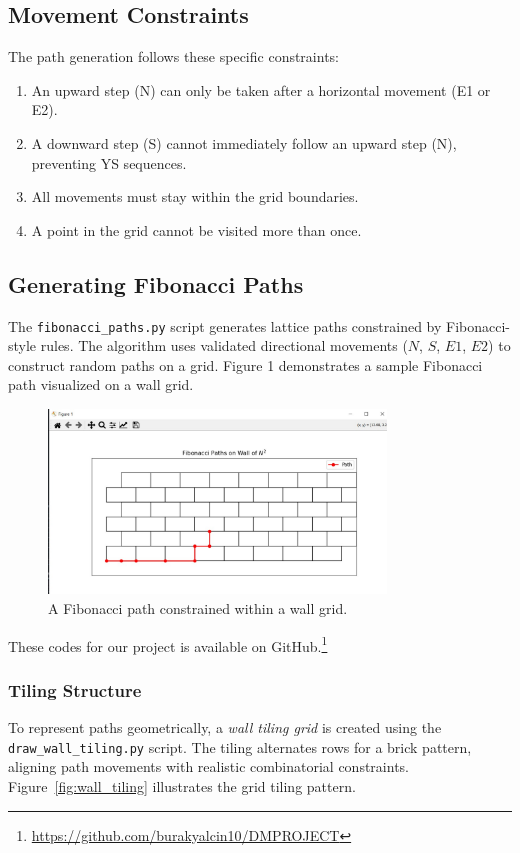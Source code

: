 \documentclass{article}
\begin{document}
\subsection{Movement Constraints}
The path generation follows these specific constraints:
\begin{enumerate}
    \item An upward step (N) can only be taken after a horizontal movement (E1 or E2).
    \item A downward step (S) cannot immediately follow an upward step (N), preventing YS sequences.
    \item All movements must stay within the grid boundaries.
    \item A point in the grid cannot be visited more than once.
\end{enumerate}

\subsection{Generating Fibonacci Paths}
The \texttt{fibonacci\_paths.py} script generates lattice paths constrained by Fibonacci-style rules. The algorithm uses validated directional movements ($N$, $S$, $E1$, $E2$) to construct random paths on a grid. Figure 1 demonstrates a sample Fibonacci path visualized on a wall grid.

\begin{figure}[h]
    \centering
    \includegraphics[width=0.8\textwidth]{images/fibonacci.jpg}
    \caption{A Fibonacci path constrained within a wall grid.}
    \label{fig:fibonacci_path}
\end{figure}

These codes for our project is available on GitHub.\footnote{\url{https://github.com/burakyalcin10/DMPROJECT}}

\subsubsection{Tiling Structure}
To represent paths geometrically, a \textit{wall tiling grid} is created using the \texttt{draw\_wall\_tiling.py} script. The tiling alternates rows for a brick pattern, aligning path movements with realistic combinatorial constraints. Figure~\ref{fig:wall_tiling} illustrates the grid tiling pattern.
\end{document}
